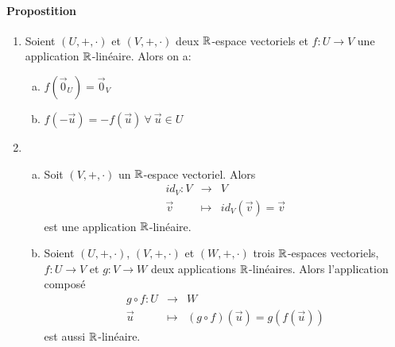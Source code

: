 \paragraph{Propostition}
\begin{enumerate} 
  \item Soient $(U, +, \cdot)$ et $(V, +, \cdot)$ deux $\mathbb{R}$-espace vectoriels et $f: U \rightarrow V$ une application $\mathbb{R}$-linéaire. Alors on a:
    \begin{enumerate}[a)] 
      \item $f(\vec{0}_U) = \vec{0}_V$
      \item $f(-\vec{u}) = -f(\vec{u}) ~\forall~ \vec{u} \in U$
    \end{enumerate}
  \item 
    \begin{enumerate}[a)]
      \item Soit $(V, +, \cdot)$ un $\mathbb{R}$-espace vectoriel. Alors
        \begin{eqnarray*}
          id_V: V &\rightarrow& V \\
          \vec{v} &\mapsto& id_{V}(\vec{v}) = \vec{v}
        \end{eqnarray*}
        est une application $\mathbb{R}$-linéaire.
      \item Soient $(U, +, \cdot)$, $(V, +, \cdot)$ et $(W, +, \cdot)$  trois $\mathbb{R}$-espaces vectoriels, $f: U \rightarrow V$ et $g: V \rightarrow W$ deux applications $\mathbb{R}$-linéaires. Alors l'application composé
        \begin{eqnarray*}
          g \circ f: U &\rightarrow& W \\
          \vec{u} &\mapsto& (g \circ f)(\vec{u}) = g(f(\vec{u}))
        \end{eqnarray*}
        est aussi $\mathbb{R}$-linéaire.
    \end{enumerate}
\end{enumerate}

